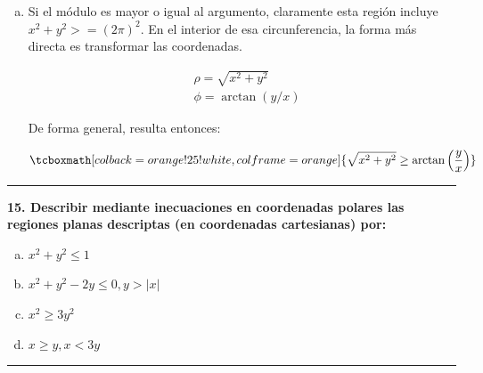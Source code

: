 \documentclass{article}
\begin{document}
\begin{enumerate}[(a)]
\item Si el módulo es mayor o igual al argumento, claramente esta región incluye $x^2 + y^2 >= (2\pi)^2$. En el interior de esa circunferencia, la forma más directa es transformar las coordenadas.

\begin{subequations}
\begin{align}
& \rho = \sqrt{x^2 + y^2} \\
& \phi = \arctan(y/x)
\end{align}
\end{subequations}

De forma general, resulta entonces:

\begin{equation}
\tcboxmath[colback=orange!25!white,colframe=orange]
{ \sqrt{x^2 + y^2} \geq \arctan \left( \frac{y}{x} \right) }
\end{equation}

\end{enumerate}

\hrule
\vspace{10 pt}
\textbf{15. Describir mediante inecuaciones en coordenadas polares las regiones planas descriptas (en coordenadas cartesianas) por:}

\begin{enumerate}[(a)]
\bfseries
\item $x^2 + y^2 \leq 1$

\item $x^2 + y^2 - 2y \leq 0, y > |x|$

\item $x^2 \geq 3y^2$

\item $x \geq y, x < 3y$
\end{enumerate}
\hrule
\end{document}
